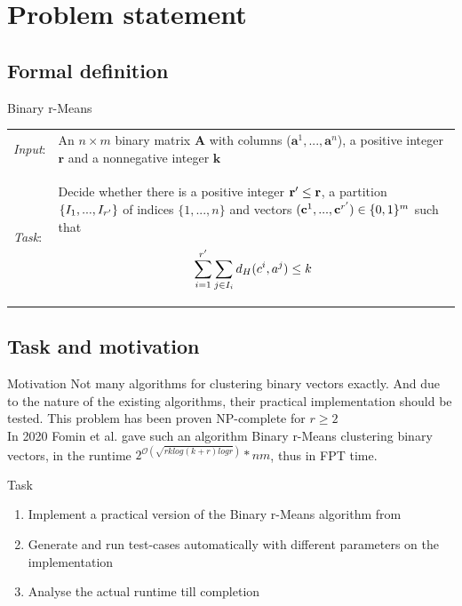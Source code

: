 \documentclass{beamer}
\begin{document}
\section{Problem statement}

\subsection{Formal definition}
\begin{frame}
  \begin{block}{Binary r-Means}
    \begin{tabular}{p{}p{}}
      \textit{Input}: & An $n \times m$ binary matrix \textbf{A} with columns
      ($\textbf{a}^1,...,\textbf{a}^n$), a positive integer $\textbf{r}$ and a nonnegative
      integer $\textbf{k}$                                                                     \\

      \pause

      \textit{Task}:  & Decide whether there is a positive integer $\textbf{r}\sp{\prime} \leq
        \textbf{r}$, a partition $\{I_1, ..., I_{r\sp{\prime}}\}$ of indices $\{1,...,n\}$ and vectors
      $(\textbf{c}^1,...,\textbf{c}^{r\sp{\prime}}) \in \{0,1\}^m$ such that

      \[
        \sum_{i = 1}^{r\sp{\prime}} \sum_{j \in I_i} d_H(c^i, a^j) \leq k
      \]
    \end{tabular}
  \end{block}
\end{frame}

\subsection{Task and motivation}
\begin{frame}
  \begin{block}{Motivation}
    Not many algorithms for clustering binary vectors exactly. And due to the
    nature of the existing algorithms, their practical implementation should be tested.
    This problem has been proven NP-complete for $r \geq 2$
    \\
    In 2020 Fomin et al. gave such an algorithm \alert{Binary r-Means} clustering binary vectors,
    in the runtime $2^{\mathcal{O} (\sqrt{rk log(k+r) logr})}*nm$, thus in FPT time.
  \end{block}

  \begin{block}{Task}
    \begin{enumerate}
      \item Implement a practical version of the \alert{Binary r-Means} algorithm from
            \cite{fomin_golovach_panolan_2020}
      \item Generate and run test-cases automatically with different parameters on
            the implementation
      \item Analyse the actual runtime till completion
    \end{enumerate}
  \end{block}
\end{frame}
\end{document}
